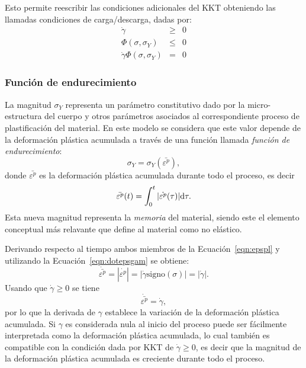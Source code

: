 Esto permite reescribir las condiciones adicionales del KKT obteniendo las llamadas condiciones de carga/descarga, dadas por:
%
\begin{eqnarray}
\dot{\gamma} &\geq& 0 \\
\Phi(\sigma,\sigma_Y) &\leq & 0\\
\dot{\gamma} \Phi(\sigma,\sigma_Y) &=& 0
\end{eqnarray}


\subsubsection{Función de endurecimiento}

La magnitud $\sigma_Y$ representa un parámetro constitutivo dado por la micro-estructura del cuerpo y otros parámetros asociados al correspondiente proceso de plastificación del material. %
%
En este modelo se considera que este valor depende de la deformación plástica acumulada a través de una función llamada \textit{función de endurecimiento}:
%
\begin{equation}
\sigma_Y = \sigma_Y (\bar{\varepsilon^p}),
\end{equation}
%
donde $\bar{\varepsilon^p}$ es la deformación plástica acumulada durante todo el proceso, es decir
%
\begin{equation}\label{eqn:epspl}
\bar{\varepsilon^p} (t) = \int_{0}^{t} |\dot{\varepsilon^p}(\tau)| {\text{d}} \tau.
\end{equation}
Esta nueva magnitud representa la \textit{memoria} del material, siendo este el elemento conceptual más relavante que define al material como no elástico.


Derivando respecto al tiempo ambos miembros de la Ecuación~\eqref{eqn:epspl} y utilizando la Ecuación~\eqref{eqn:dotepsgam} se obtiene:
%
\begin{equation}
\dot{ \bar{\varepsilon^p}} = %
|\dot{ \varepsilon^p}| = |\dot{ \gamma} \text{signo}(\sigma)| = |\dot{ \gamma} |.
\end{equation}
%
Usando que $\dot{ \gamma} \geq 0$ se tiene
%
\begin{equation}
\dot{ \bar{\varepsilon^p}}  = \dot{\gamma},
\end{equation}
%
por lo que la derivada de $\gamma$ establece la variación de la deformación plástica acumulada. %
%
Si $\gamma$ es considerada nula al inicio del proceso puede ser fácilmente interpretada como la deformación plástica acumulada, lo cual también es compatible con la condición dada por KKT de $\dot{\gamma}\geq0$, es decir que la magnitud de la deformación plástica acumulada es creciente durante todo el proceso. %



